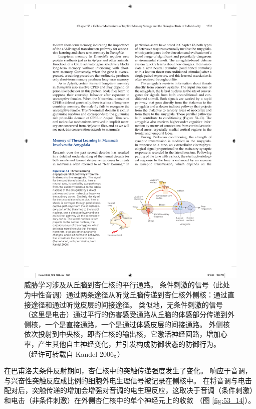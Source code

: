 \begin{figure}[htbp]
	\centering
	\includegraphics[width=0.7\linewidth]{chap53/fig_53_13}
	\caption{威胁学习涉及从丘脑到杏仁核的平行通路。 条件刺激的信号（此处为中性音调）通过两条途径从听觉丘脑传递到杏仁核外侧核：通过直接途径和通过听觉皮层的间接途径。 类似地，无条件刺激的信号（这里是电击）通过平行的伤害感受通路从丘脑的体感部分传递到外侧核，一个是直接通路，一个是通过体感皮层的间接通路。 外侧核依次投射到中央核，即杏仁核的输出核，它激活神经回路，增加心率，产生其他自主神经变化，并引发构成防御状态的防御行为。 （经许可转载自 Kandel 2006。）}
	\label{fig:53_13}
\end{figure}

在巴甫洛夫条件反射期间，杏仁核中的突触传递强度发生了变化。 响应于音调，与兴奋性突触反应成比例的细胞外电生理信号被记录在侧核中。 在将音调与电击配对后，突触传递的增加会增强对音调的电生理反应，这取决于音调（条件刺激）和电击（非条件刺激）在外侧杏仁核中的单个神经元上的收敛 （图 \ref{fig:53_14}）。

